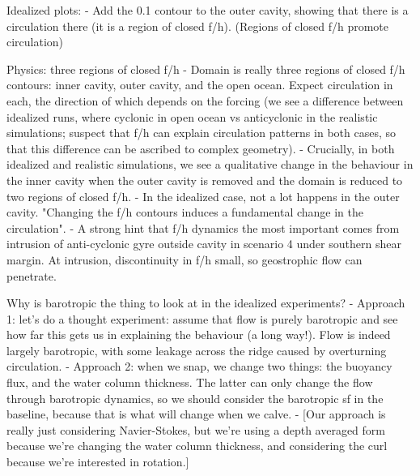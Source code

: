 Idealized plots:
    - Add the 0.1 contour to the outer cavity, showing that there is a circulation there (it is a region of closed f/h). (Regions of closed f/h promote circulation)

Physics: three regions of closed f/h
    - Domain is really three regions of closed f/h contours: inner cavity, outer cavity, and the open ocean. Expect circulation in each, the direction of which depends on the forcing (we see a difference between idealized runs, where cyclonic in open ocean vs anticyclonic in the realistic simulations; suspect that f/h can explain circulation patterns in both cases, so that this difference can be ascribed to complex geometry).
    - Crucially, in both idealized and realistic simulations, we see a qualitative change in the behaviour in the inner cavity when the outer cavity is removed and the domain is reduced to two regions of closed f/h. 
    - In the idealized case, not a lot happens in the outer cavity. "Changing the f/h contours induces a fundamental change in the circulation".
    - A strong hint that f/h dynamics the most important comes from intrusion of anti-cyclonic gyre outside cavity in scenario 4 under southern shear margin. At intrusion, discontinuity in f/h small, so geostrophic flow can penetrate.
    
Why is barotropic the thing to look at in the idealized experiments?
    - Approach 1: let's do a thought experiment: assume that flow is purely barotropic and see how far this gets us in explaining the behaviour (a long way!). Flow is indeed largely barotropic, with some leakage across the ridge caused by overturning circulation.
    - Approach 2: when we snap, we change two things: the buoyancy flux, and the water column thickness. The latter can only change the flow through barotropic dynamics, so we should consider the barotropic sf in the baseline, because that is what will change when we calve. 
    - [Our approach is really just considering Navier-Stokes, but we're using a depth averaged form because we're changing the water column thickness, and considering the curl because we're interested in rotation.]

    
